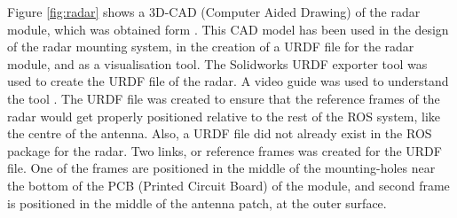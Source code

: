 Figure \ref{fig:radar} shows a 3D-CAD (Computer Aided Drawing) of the radar module, which was obtained form \cite{awr1843boost3dmodel}. This CAD model has been used in the design of the radar mounting system, in the creation of a URDF file for the radar module, and as a visualisation tool. The Solidworks URDF exporter tool \cite{sw_urdf_exporter} was used to create the URDF file of the radar. A video guide was used to understand the tool \cite{solidworksURDFExport}. The URDF file was created to ensure that the reference frames of the radar would get properly positioned relative to the rest of the ROS system, like the centre of the antenna. Also, a URDF file did not already exist in the ROS package for the radar. Two links, or reference frames was created for the URDF file. One of the frames are positioned in the middle of the mounting-holes near the bottom of the PCB (Printed Circuit Board) of the module, and second frame is positioned in the middle of the antenna patch, at the outer surface. 

